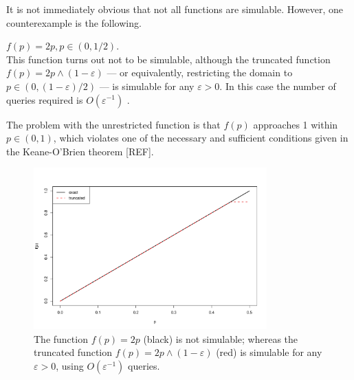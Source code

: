 \documentclass{article}
\theoremstyle{definition}
\newenvironment{example}
  {\pushQED{\qed}\renewcommand{\qedsymbol}{$\triangle$}\examplex}
  {\popQED\endexamplex}
\begin{document}
It is not immediately obvious that not all functions are simulable. However, one counterexample is the following.

\begin{example}\label{ex:2p}
$f(p) = 2p, p\in(0,1/2)$.\\
This function turns out not to be simulable, although the truncated function $f(p) = 2p \wedge (1-\varepsilon)$ --- or equivalently, restricting the domain to $p\in(0,(1 - \varepsilon)/2)$ --- is simulable for any $\varepsilon>0$. In this case the number of queries required is $O(\varepsilon ^{-1})$ \citep{huber2016}.

The problem with the unrestricted function is that $f(p)$ approaches 1 within $p\in(0,1)$, which violates one of the necessary and sufficient conditions given in the Keane-O'Brien theorem [REF].
\begin{figure}
\centering
\includegraphics[width=0.8\textwidth]{2p_truncation.pdf}
\caption{The function $f(p)=2p$ (black) is not simulable; whereas the truncated function $f(p)=2p\wedge (1-\varepsilon)$ (red) is simulable for any $\varepsilon>0$, using $O(\varepsilon^{-1})$ queries.}
\label{fig:2p_truncation}
\end{figure}
\end{example}
\end{document}
